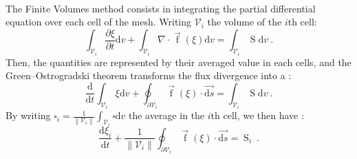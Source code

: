       \paragraph{}
      The Finite Volumes method consists in integrating the partial differential equation over each cell of the mesh.
      Writing $\mathcal{V}_i$ the volume of the $i$th cell:
      \begin{equation}
        \int_{\mathcal{V}_i} \frac{\partial \xi}{\partial t} \mathrm{d}v + \int_{\mathcal{V}_i} \nabla\cdot \vec{\operatorname{f}}\left(\xi\right) \mathrm{d}v = \int_{\mathcal{V}_i} \operatorname{S} \mathrm{d}v\ .
      \end{equation}
      Then, the quantities are represented by their averaged value in each cells, and the Green--Ostrogradski theorem transforms the flux divergence into a  :
      \begin{equation}
        \frac{\mathrm{d}}{\mathrm{d} t} \int_{\mathcal{V}_i} \xi\mathrm{d}v + \oint_{\partial\mathcal{V}_i} \vec{\operatorname{f}}\left(\xi\right) \cdot \vec{\mathrm{d}s} = \int_{\mathcal{V}_i} \operatorname{S} \mathrm{d}v\ .
      \end{equation}
      By writing $\square_i = \frac{1}{\left\|\mathcal{V}_i\right\|} \int_{\mathcal{V}_i} \square \mathrm{d}v$ the average in the $i$th cell, we then have :
      \begin{equation}
        \frac{\mathrm{d}\xi_i}{\mathrm{d} t}  + \frac{1}{\left\|\mathcal{V}_i\right\|} \oint_{\partial\mathcal{V}_i} \vec{\operatorname{f}}\left(\xi\right) \cdot \vec{\mathrm{d}s} = \operatorname{S}_i \ .
      \end{equation}

